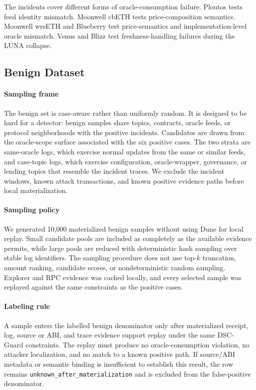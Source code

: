 \documentclass[final,5p]{elsarticle}
\newcommand{\code}[1]{\texttt{#1}}
\begin{document}
The incidents cover different forms of oracle-consumption failure.
Ploutos tests feed identity mismatch.
Moonwell cbETH tests price-composition semantics.
Moonwell wrsETH and Blueberry test price-semantics and implementation-level oracle mismatch.
Venus and Blizz test freshness-handling failures during the LUNA collapse.

\subsection{Benign Dataset}

\paragraph{Sampling frame}
The benign set is case-aware rather than uniformly random.
It is designed to be hard for a detector: benign samples share topics, contracts, oracle feeds, or protocol neighborhoods with the positive incidents.
Candidates are drawn from the oracle-scope surface associated with the six positive cases.
The two strata are same-oracle logs, which exercise normal updates from the same or similar feeds, and case-topic logs, which exercise configuration, oracle-wrapper, governance, or lending topics that resemble the incident traces.
We exclude the incident windows, known attack transactions, and known positive evidence paths before local materialization.

\paragraph{Sampling policy}
We generated 10,000 materialized benign samples without using Dune for local replay.
Small candidate pools are included as completely as the available evidence permits, while large pools are reduced with deterministic hash sampling over stable log identifiers.
The sampling procedure does not use top-\(k\) truncation, amount ranking, candidate scores, or nondeterministic random sampling.
Explorer and RPC evidence was cached locally, and every selected sample was replayed against the same constraints as the positive cases.

\paragraph{Labeling rule}
A sample enters the labelled benign denominator only after materialized receipt, log, source or ABI, and trace evidence support replay under the same DSC-Guard constraints.
The replay must produce no oracle-consumption violation, no attacker localization, and no match to a known positive path.
If source/ABI metadata or semantic binding is insufficient to establish this result, the row remains \code{unknown\_after\_materialization} and is excluded from the false-positive denominator.
\end{document}
